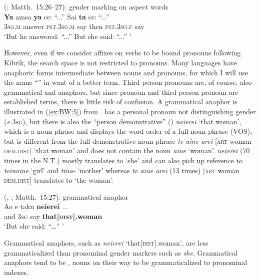 \documentclass[output=collectionpaper]{langsci/langscibook}
\begin{document}
\ea\label{ex:BW:4}
 (; Matth.~15:26–27): gender marking on aspect words\\
\gll \textbf{Ya}	amsa	\textbf{ya}	ce:	``...''	Sai	\textbf{ta}	ce:	``...''\\
\textsc{3sg.m}	answer	\textsc{pst.3sg.m}	say	{}	then	\textsc{pst.3sg.f}	say\\
\glt ‘But he answered: ``...'' But she said: ``...'' ’
\z

However, even if we consider affixes on verbs to be bound pronouns following Kibrik, the search space is not restricted to pronouns. Many languages have anaphoric forms intermediate between nouns and pronouns, for which I will use the name ``'' in want of a better term. Third person pronouns are, of course, also grammatical and anaphors, but since pronoun and third person pronoun are established terms, there is little risk of confusion. A grammatical anaphor is illustrated in (\ref{ex:BW:5}) from .  has a personal pronoun not distinguishing gender (\textit{e} \textsc{3sg}), but there is also the “person demonstrative” (\citealt[176]{Trussel1979}) \textit{neierei} ‘that woman’, which is a noun phrase and displays the word order of a full noun phrase (VOS), but is different from the full demonstrative noun phrase \textit{te aine arei} [\textsc{art} woman \textsc{dem.dist}] ‘that woman’ and does not contain the noun \textit{aine} ‘woman’.  \textit{neierei} (70 times in the N.T.\@) mostly translates to ‘she’ and can also pick up reference to \textit{teinaine} ‘girl’ and \textit{tina-} ‘mother’ whereas \textit{te aine arei}
(13 times) [\textsc{art} woman \textsc{dem.dist}] translates to ‘the woman’.

\ea\label{ex:BW:5}
 (, ; Matth.~15:27): grammatical anaphor\\
\gll Ao 	e 	taku 	\textbf{neierei}		... \\
and 	\textsc{3sg} 	say 	\textbf{that[\textsc{dist}].woman} \\
\glt ‘But she said: ``\ldots'' '
\z

Grammatical anaphors, such as  \textit{neierei} ‘that[\textsc{dist}].woman’, are less grammaticalized than pronominal gender markers such as  \textit{she}. Grammatical anaphors tend to be , nouns on their way to be grammaticalized to pronominal indexes.
\end{document}
